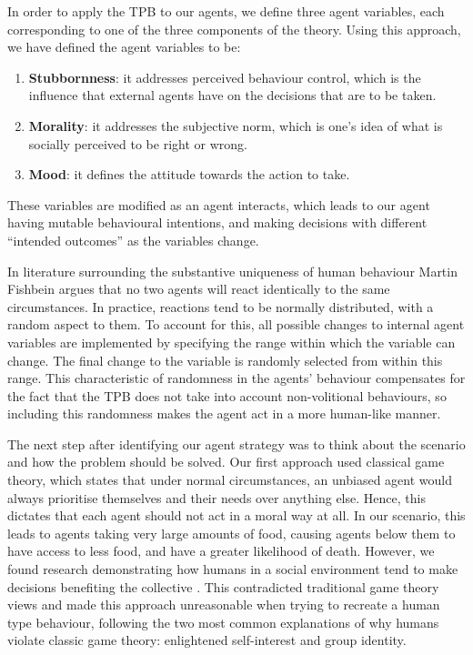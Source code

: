 In order to apply the TPB to our agents, we define three agent variables, each corresponding to one of the three components of the theory. Using this approach, we have defined the agent variables to be: 
\begin{enumerate}
    \item \textbf{Stubbornness}: it addresses perceived behaviour control, which is the influence that external agents have on the decisions that are to be taken.
    \item \textbf{Morality}: it addresses the subjective norm, which is one's idea of what is socially perceived to be right or wrong.
    \item \textbf{Mood}: it defines the attitude towards the action to take.
\end{enumerate}
These variables are modified as an agent interacts, which leads to our agent having mutable behavioural intentions, and making decisions with different “intended outcomes” as the variables change. \par
In literature surrounding the substantive uniqueness of human behaviour \cite{TRA} Martin Fishbein argues that no two agents will react identically to the same circumstances. In practice, reactions tend to be normally distributed, with a random aspect to them. To account for this, all possible changes to  internal agent variables are implemented by specifying the range within which the variable can change. The final change to the variable is randomly selected from within this range. This characteristic of randomness in the agents’ behaviour compensates for the fact that the TPB does not take into account non-volitional behaviours, so including this randomness makes the agent act in a more human-like manner.\par 
The next step after identifying our agent strategy was to think about the scenario and how the problem should be solved. Our first approach used classical game theory, which states that under normal circumstances, an unbiased agent would always prioritise themselves and their needs over anything else. Hence, this dictates that each agent should not act in a moral way at all. In our scenario, this leads to agents taking very large amounts of food, causing agents below them to have access to less food, and have a greater likelihood of death. However, we found research demonstrating how humans in a social environment tend to make decisions benefiting the collective \cite{batson_batson_todd_brummett_shaw_aldeguer_1995}. This contradicted traditional game theory views and made this approach unreasonable when trying to recreate a human type behaviour, following the two most common explanations of why humans violate classic game theory: enlightened self-interest and group identity.\par 
